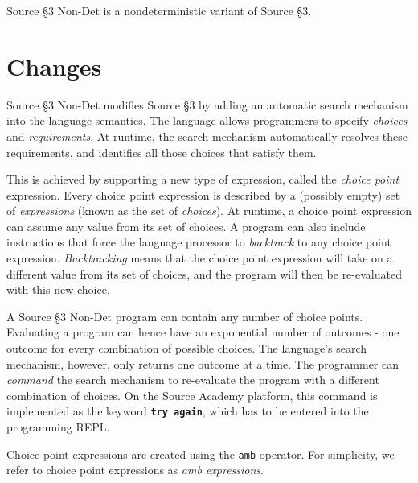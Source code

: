 





Source \S 3 Non-Det is a nondeterministic variant of Source \S 3.

\section*{Changes}

Source \S 3 Non-Det modifies Source \S 3 by adding an automatic search mechanism into the language semantics. The language allows programmers to specify \emph{choices} and \emph{requirements}. At runtime, the search mechanism automatically resolves these requirements, and identifies all those choices that satisfy them. \newline

This is achieved by supporting a new type of expression, called the \emph{choice point} expression. Every choice point expression is described by a (possibly empty) set of \emph{expressions} (known as the set of \emph{choices}). At runtime, a choice point expression can assume any value from its set of choices. A program can also include instructions that force the language processor to \emph{backtrack} to any choice point expression. \emph{Backtracking} means that the choice point expression will take on a different value from its set of choices, and the program will then be re-evaluated with this new choice. \newline

A Source \S 3 Non-Det program can contain any number of choice points. Evaluating a program can hence have an exponential number of outcomes - one outcome for every combination of possible choices. The language's search mechanism, however, only returns one outcome at a time. The programmer can \emph{command} the search mechanism to re-evaluate the program with a different combination of choices. On the Source Academy platform, this command is implemented as the keyword
\textbf{\texttt{try again}}, which has to be entered into the programming REPL. \newline

Choice point expressions are created using the \texttt{amb} operator. For simplicity, we refer to choice point expressions as \emph{amb expressions}.


